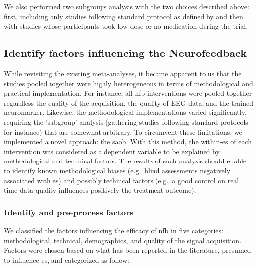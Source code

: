 We also performed two subgroups analysis with the two choices described above: 
first, including only studies following standard protocol as defined by \citet{Arns2014} and then with studies 
whose participants took low-dose or no medication during the trial.  

\subsection{Identify factors influencing the Neurofeedback}

While revisiting the existing meta-analyses, it became apparent to us that the studies pooled together were highly heterogeneous 
in terms of methodological and practical implementation. For instance, all \gls{nfb} 
interventions were pooled together regardless the quality of the acquisition, the quality of EEG data, and the trained 
neuromarker. Likewise, the methodological implementations varied significantly, requiring the 
'subgroup' analysis (gathering studies following standard protocols for instance) that are somewhat arbitrary. To circumvent these limitations, we 
implemented a novel approach: the \gls{saob}. With this method, the within-\gls{es} of each intervention was considered 
as a dependent variable to be explained by methodological and technical factors. The results 
of such analysis should enable to identify known methodological biases (e.g.\ blind assessments negatively associated 
with \gls{es}) and possibly technical factors (e.g.\ a good control on real time data quality influences positively the 
treatment outcome). 

\subsubsection{Identify and pre-process factors}

We classified the factors influencing the efficacy of \gls{nfb} in five categories: methodological, technical,
demographics, and quality of the signal acquisition. 
Factors were chosen based on what has been reported in the literature, presumed to influence \gls{es}, 
and categorized as follow:

